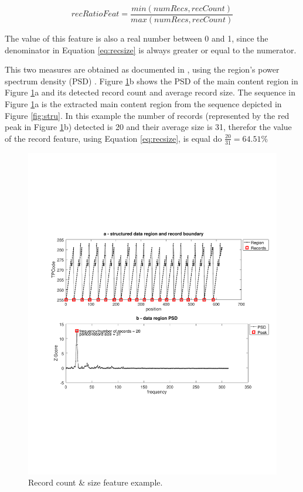 \begin{equation}\label{eq:recsize}
recRatioFeat = \frac{min(numRecs, recCount)}{max(numRecs, recCount)}
\end{equation}

The value of this feature is also a real number between 0 and 1, since the
denominator in Equation \ref{eq:recsize} is always greater or equal to the
numerator.

This two measures are obtained as documented in
\cite{Velloso:2017:ERW:3132847.3132875}, using the region's power spectrum
density (PSD) \cite{oppenheim1989discrete}.
Figure \ref{fig:fft}b shows the PSD of the main content region in Figure
\ref{fig:fft}a and its detected record count and average record size. The
sequence in Figure \ref{fig:fft}a is the extracted main content region
from the sequence depicted in Figure \ref{fig:stru}.
In this example the number of records (represented by the red peak in Figure
\ref{fig:fft}b) detected is 20 and their average size is 31, therefor the
value of the record feature, using Equation \ref{eq:recsize}, is equal do
$\frac{20}{31}=64.51\%$

\begin{figure}[h]
  \centering
     \includegraphics[trim={2.0cm 7.0cm 0.7cm 6.9cm}, clip, 
     width=\columnwidth]{img/fftreg-no-ang.pdf}
  \caption{Record count \& size feature example.}
  \label{fig:fft}
\end{figure}

